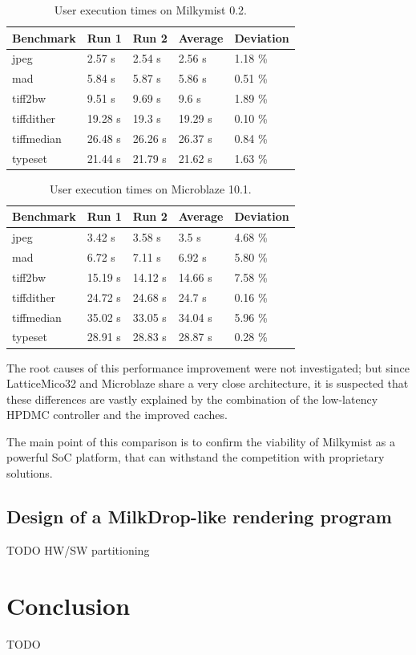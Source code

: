 \documentclass[a4paper,11pt]{kthesis}
\begin{document}
\begin{table}
\centering
\begin{tabular}{|l|l|l|l|l|}
\hline
\textbf{Benchmark} & \textbf{Run 1} & \textbf{Run 2} & \textbf{Average} & \textbf{Deviation}  \\
\hline
jpeg & 2.57 s & 2.54 s & 2.56 s & 1.18 \% \\
\hline
mad & 5.84 s & 5.87 s & 5.86 s & 0.51 \% \\
\hline
tiff2bw & 9.51 s & 9.69 s & 9.6 s & 1.89 \% \\
\hline
tiffdither & 19.28 s & 19.3 s & 19.29 s & 0.10 \% \\
\hline
tiffmedian & 26.48 s & 26.26 s & 26.37 s & 0.84 \% \\
\hline
typeset & 21.44 s & 21.79 s & 21.62 s & 1.63 \% \\
\hline
\end{tabular}
\caption{User execution times on Milkymist 0.2.}\label{tab:milkymistspeed}
\end{table}

\begin{table}
\centering
\begin{tabular}{|l|l|l|l|l|}
\hline
\textbf{Benchmark} & \textbf{Run 1} & \textbf{Run 2} & \textbf{Average} & \textbf{Deviation}  \\
\hline
jpeg & 3.42 s & 3.58 s & 3.5 s & 4.68 \% \\
\hline
mad & 6.72 s & 7.11 s & 6.92 s & 5.80 \% \\
\hline
tiff2bw & 15.19 s & 14.12 s & 14.66 s & 7.58 \% \\
\hline
tiffdither & 24.72 s & 24.68 s & 24.7 s & 0.16 \% \\
\hline
tiffmedian & 35.02 s & 33.05 s & 34.04 s & 5.96 \% \\
\hline
typeset & 28.91 s & 28.83 s & 28.87 s & 0.28 \% \\
\hline
\end{tabular}
\caption{User execution times on Microblaze 10.1.}\label{tab:microblazespeed}
\end{table}

The root causes of this performance improvement were not investigated; but since LatticeMico32 and Microblaze share a very close architecture, it is suspected that these differences are vastly explained by the combination of the low-latency HPDMC controller and the improved caches.

The main point of this comparison is to confirm the viability of Milkymist as a powerful SoC platform, that can withstand the competition with proprietary solutions.

\section{Design of a MilkDrop-like rendering program}
TODO HW/SW partitioning

\chapter{Conclusion}
TODO

{}

\end{document}
